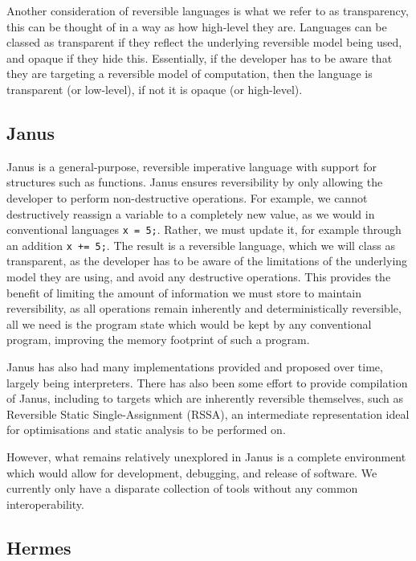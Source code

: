 Another consideration of reversible languages is what we refer to as transparency, this can be thought of in a way as how high-level they are. Languages can be classed as transparent if they reflect the underlying reversible model being used, and opaque if they hide this. Essentially, if the developer has to be aware that they are targeting a reversible model of computation, then the language is transparent (or low-level), if not it is opaque (or high-level).


\subsection{Janus}

Janus is a general-purpose, reversible imperative language with support for structures such as functions\cite{Janus}. Janus ensures reversibility by only allowing the developer to perform non-destructive operations. For example, we cannot destructively reassign a variable to a completely new value, as we would in conventional languages \lstinline{x = 5;}. Rather, we must update it, for example through an addition \lstinline{x += 5;}. The result is a reversible language, which we will class as transparent, as the developer has to be aware of the limitations of the underlying model they are using, and avoid any destructive operations. This provides the benefit of limiting the amount of information we must store to maintain reversibility, as all operations remain inherently and deterministically reversible, all we need is the program state which would be kept by any conventional program, improving the memory footprint of such a program\cite{JanusFormalism, JanusReversibleSurvey}.

Janus has also had many implementations provided and proposed over time, largely being interpreters\cite{JanusFormalism, JanusPlayground, LinearTimeJanusInterpreter}. There has also been some effort to provide compilation of Janus, including to targets which are inherently reversible themselves, such as Reversible Static Single-Assignment (RSSA)\cite{RSSA}, an intermediate representation ideal for optimisations and static analysis to be performed on\cite{JanusToRSSA}.

However, what remains relatively unexplored in Janus is a complete environment which would allow for development, debugging, and release of software. We currently only have a disparate collection of tools without any common interoperability.

\subsection{Hermes}

